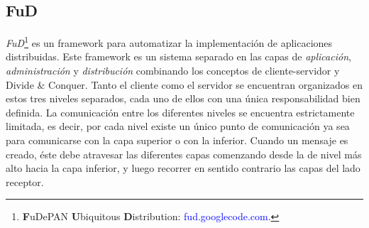 \documentclass[12pt,a4paper,spanish]{article}
\begin{document}
	\subsection{FuD}
		\par \textit{FuD}\footnote{\textbf{F}uDePAN \textbf{U}biquitous \textbf{D}istribution: \textcolor{blue}	{fud.googlecode.com.}} es un framework para automatizar la implementación de aplicaciones distribuidas. Este framework es 			un sistema separado en las capas de \textit{aplicación}, \textit{administración} y \textit{distribución} 			combinando los conceptos de cliente-servidor y Divide \& Conquer. Tanto el cliente como el servidor se 		
		encuentran organizados en estos tres niveles separados, cada uno de ellos con una única responsabilidad bien 			definida. La comunicación entre los diferentes niveles se encuentra estrictamente
		limitada, es decir, por cada nivel existe un único punto de comunicación ya sea para comunicarse con la capa 			superior o con la inferior. Cuando un mensaje es creado, éste debe atravesar las diferentes capas comenzando desde 			la de nivel más alto hacia la capa inferior, y luego recorrer en sentido contrario las capas del lado receptor.
\end{document}
